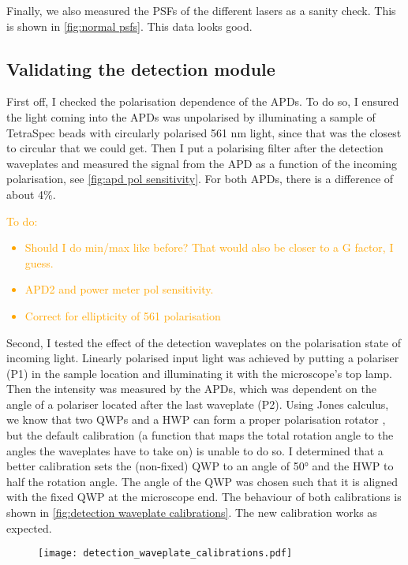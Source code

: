 Finally, we also measured the PSFs of the different lasers as a sanity check. This is shown in \autoref{fig:normal psfs}. This data looks good.  

\subsection{Validating the detection module}

First off, I checked the polarisation dependence of the APDs. To do so, I ensured the light coming into the APDs was unpolarised by illuminating a sample of TetraSpec beads with circularly polarised 561 nm light, since that was the closest to circular that we could get. Then I put a polarising filter after the detection waveplates and measured the signal from the APD as a function of the incoming polarisation, see \autoref{fig:apd pol sensitivity}. For both APDs, there is a difference of about 4\%.

\textcolor{orange}{
To do:
	\begin{itemize}
		\item Should I do min/max like before? That would also be closer to a G factor, I guess.
		\item APD2 and power meter pol sensitivity.
		\item Correct for ellipticity of 561 polarisation
	\end{itemize}
} 

Second, I tested the effect of the detection waveplates on the polarisation state of incoming light. Linearly polarised input light was achieved by putting a polariser (P1) in the sample location and illuminating it with the microscope's top lamp. Then the intensity was measured by the APDs, which was dependent on the angle of a polariser located after the last waveplate (P2). Using Jones calculus, we know that two QWPs and a HWP can form a proper polarisation rotator , but the default calibration (a function that maps the total rotation angle to the angles the waveplates have to take on) is unable to do so. I determined that a better calibration sets the (non-fixed) QWP to an angle of 50° and the HWP to half the rotation angle. The angle of the QWP was chosen such that it is aligned with the fixed QWP at the microscope end. The behaviour of both calibrations is shown in \autoref{fig:detection waveplate calibrations}. The new calibration works as expected.

\begin{figure}
	\centering
	\texttt{[image: detection\_waveplate\_calibrations.pdf]}
	\caption{}
	\label{fig:detection waveplate calibrations}
\end{figure}

